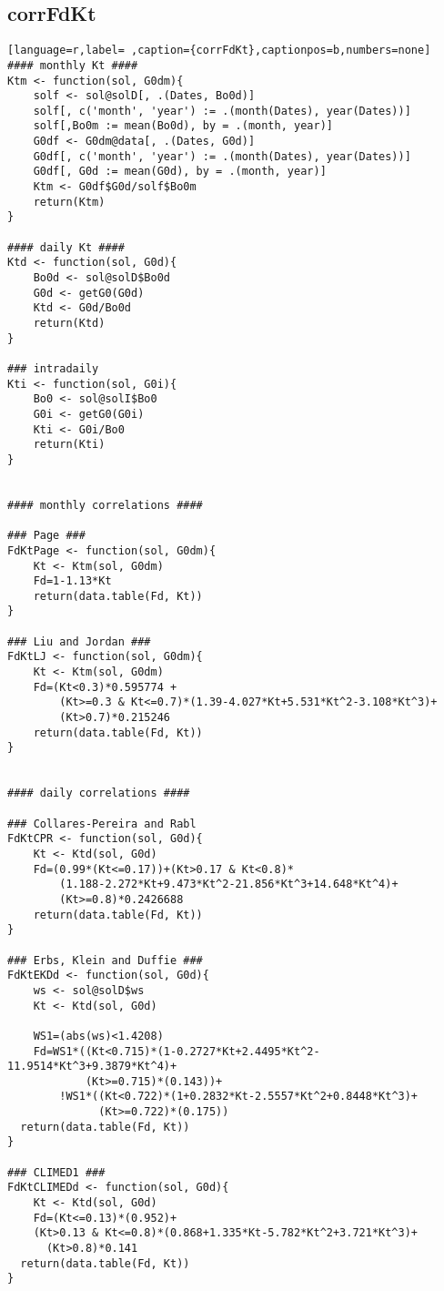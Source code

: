 \subsection{corrFdKt}
\label{sec:org2794d2b}
\label{subsec:corrfdkt}
\begin{lstlisting}[language=r,label= ,caption={corrFdKt},captionpos=b,numbers=none]
#### monthly Kt ####
Ktm <- function(sol, G0dm){
    solf <- sol@solD[, .(Dates, Bo0d)]
    solf[, c('month', 'year') := .(month(Dates), year(Dates))]
    solf[,Bo0m := mean(Bo0d), by = .(month, year)]
    G0df <- G0dm@data[, .(Dates, G0d)]
    G0df[, c('month', 'year') := .(month(Dates), year(Dates))]
    G0df[, G0d := mean(G0d), by = .(month, year)]
    Ktm <- G0df$G0d/solf$Bo0m
    return(Ktm)
}

#### daily Kt ####
Ktd <- function(sol, G0d){
    Bo0d <- sol@solD$Bo0d
    G0d <- getG0(G0d)
    Ktd <- G0d/Bo0d
    return(Ktd)
}

### intradaily
Kti <- function(sol, G0i){
    Bo0 <- sol@solI$Bo0
    G0i <- getG0(G0i)
    Kti <- G0i/Bo0
    return(Kti)
}


#### monthly correlations ####

### Page ###
FdKtPage <- function(sol, G0dm){
    Kt <- Ktm(sol, G0dm)
    Fd=1-1.13*Kt
    return(data.table(Fd, Kt))
}

### Liu and Jordan ###
FdKtLJ <- function(sol, G0dm){
    Kt <- Ktm(sol, G0dm)
    Fd=(Kt<0.3)*0.595774 +
        (Kt>=0.3 & Kt<=0.7)*(1.39-4.027*Kt+5.531*Kt^2-3.108*Kt^3)+
        (Kt>0.7)*0.215246
    return(data.table(Fd, Kt))
}


#### daily correlations ####

### Collares-Pereira and Rabl
FdKtCPR <- function(sol, G0d){
    Kt <- Ktd(sol, G0d)
    Fd=(0.99*(Kt<=0.17))+(Kt>0.17 & Kt<0.8)*
        (1.188-2.272*Kt+9.473*Kt^2-21.856*Kt^3+14.648*Kt^4)+
        (Kt>=0.8)*0.2426688      
    return(data.table(Fd, Kt))
}

### Erbs, Klein and Duffie ###
FdKtEKDd <- function(sol, G0d){
    ws <- sol@solD$ws
    Kt <- Ktd(sol, G0d)

    WS1=(abs(ws)<1.4208)
    Fd=WS1*((Kt<0.715)*(1-0.2727*Kt+2.4495*Kt^2-11.9514*Kt^3+9.3879*Kt^4)+
            (Kt>=0.715)*(0.143))+
        !WS1*((Kt<0.722)*(1+0.2832*Kt-2.5557*Kt^2+0.8448*Kt^3)+
              (Kt>=0.722)*(0.175))
  return(data.table(Fd, Kt))
}

### CLIMED1 ###
FdKtCLIMEDd <- function(sol, G0d){
    Kt <- Ktd(sol, G0d)
    Fd=(Kt<=0.13)*(0.952)+
    (Kt>0.13 & Kt<=0.8)*(0.868+1.335*Kt-5.782*Kt^2+3.721*Kt^3)+
      (Kt>0.8)*0.141
  return(data.table(Fd, Kt))
}


\end{lstlisting}
